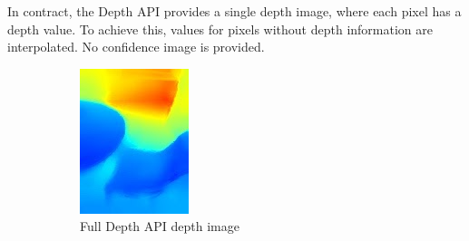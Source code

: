 In contract, the Depth API provides a single depth image, where each pixel has a depth value.
To achieve this, values for pixels without depth information are interpolated.
No confidence image is provided.

\begin{figure}[ht!]
    \centering
    \begin{subfigure}[b]{0.4\textwidth}
        \centering
        \includegraphics[width=0.8\linewidth]{images/depth_full-depth-image}
        \caption{Full Depth API depth image}
    \end{subfigure}%
    \begin{subfigure}[b]{0.4\textwidth}
        \centering

\end{subfigure}
\end{figure}
